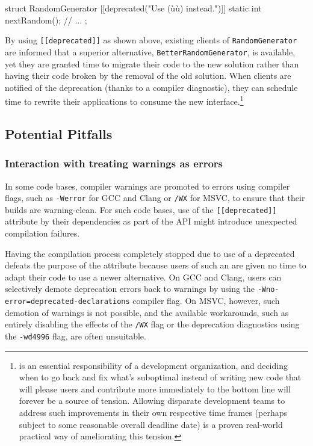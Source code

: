 \begin{emcppslisting}[language=C++]
struct RandomGenerator
{
    [[deprecated("Use (ù{}ù) instead.")]]
    static int nextRandom();
        // ...
};
\end{emcppslisting}
    
\noindent By using \lstinline![[deprecated]]! as shown above, existing clients of
\lstinline!RandomGenerator! are informed that a superior
alternative, \lstinline!BetterRandomGenerator!, is available, yet they are granted time to
migrate their code to the new solution rather than having their code broken by the
removal of the old solution. When clients are notified of the
deprecation (thanks to a compiler diagnostic), they can schedule time to rewrite their applications to consume the new interface.{\cprotect\footnote{ is
an essential responsibility of a development organization, and
deciding when to go back and fix what's suboptimal instead of writing
new code that will please users and contribute more immediately to the
bottom line will forever be a source of tension. Allowing disparate
development teams to address such improvements in their own respective
time frames (perhaps subject to some reasonable overall deadline
date) is a proven real-world practical way of ameliorating this
  tension.}}

\subsection[Potential Pitfalls]{Potential Pitfalls}\label{potential-pitfalls}

\subsubsection[Interaction with treating warnings as errors]{Interaction with treating warnings as errors}\label{interaction-with--werror-(e.g,-gcc,-clang)-or-/wx-(msvc)}

In some code bases, compiler warnings are promoted to errors using compiler flags, such as \lstinline!-Werror! for GCC and Clang or \lstinline!/WX! for MSVC, to ensure that their builds are warning-clean. For such code bases, use of the \lstinline![[deprecated]]! attribute by their dependencies as part of the API might introduce unexpected compilation failures. 

Having the compilation process completely stopped due to use of a
deprecated  defeats the purpose of the attribute because users of such an  are given no time to adapt their code
to use a newer alternative. On GCC and Clang, users can selectively demote deprecation errors back to warnings by using the
\lstinline!-Wno-error=deprecated-declarations! compiler flag. On MSVC,
however, such demotion of warnings is not possible, and the available workarounds, such as entirely disabling the effects of the \lstinline!/WX! flag or the deprecation diagnostics using the  \lstinline!-wd4996! flag, are often unsuitable.

